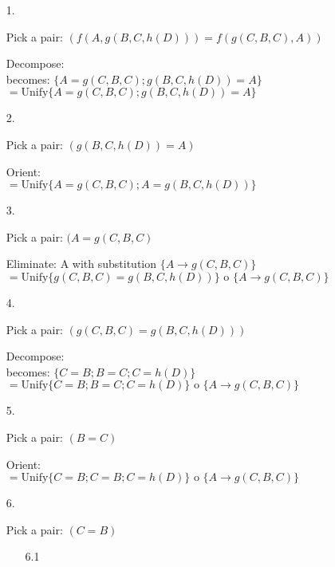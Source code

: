 \begin{enumerate}
	\item[1.]
	
	Pick a pair: \( (f(A, g(B,C,h(D) ) ) = f(g(C,B,C), A ) )\)
	
	Decompose: \\
	\hspace*{8mm}becomes: \( \{ A = g(C,B,C); g(B,C,h(D)) = A \} \) \\
	\hspace*{4mm}\( = \text{Unify} \{ A = g(C,B,C); g(B,C,h(D)) = A \} \)		
	
	\item[2.]
	
	Pick a pair: \( (g(B,C,h(D)) = A) \)
	
	Orient: \\
	\hspace*{4mm}\( = \text{Unify} \{ A = g(C,B,C); A = g(B,C,h(D)) \} \)	
		
	\item[3.]
	
	Pick a pair: \( (A = g(C,B,C) \)
	
	Eliminate: A with substitution \( \{ A \rightarrow g(C,B,C) \} \) \\
	\hspace*{4mm}\( = \text{Unify} \{ g(C,B,C) = g(B,C,h(D)) \}\text{ o }\{ A \rightarrow g(C,B,C) \} \)		
		
	\item[4.]
	
	Pick a pair: \( (g(C,B,C) = g(B,C,h(D)) ) \)
	
	Decompose: \\
	\hspace*{8mm}becomes: \( \{ C = B; B = C; C = h(D)  \} \) \\
	\hspace*{4mm}\( = \text{Unify} \{ C = B; B = C; C = h(D) \}\text{ o }\{ A \rightarrow g(C,B,C) \} \)		
		
	\item[5.]
	
	Pick a pair: \( ( B = C ) \)
	
	Orient: \\
	\hspace*{4mm}\( = \text{Unify} \{ C = B; C = B; C = h(D) \}\text{ o }\{ A \rightarrow g(C,B,C) \} \)		
		
	\item[6.]
	
	Pick a pair: \( ( C = B ) \)
	
	\begin{enumerate}
	\item[6.1]
	

\end{enumerate}
\end{enumerate}
